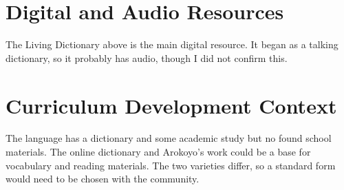 \documentclass[12pt]{article}
\begin{document}
\section{Digital and Audio Resources}
The Living Dictionary above is the main digital resource. It began as a talking dictionary, so it probably has audio, though I did not confirm this.

\section{Curriculum Development Context}
The language has a dictionary and some academic study but no found school materials. The online dictionary and Arokoyo's work could be a base for vocabulary and reading materials. The two varieties differ, so a standard form would need to be chosen with the community.
\end{document}
